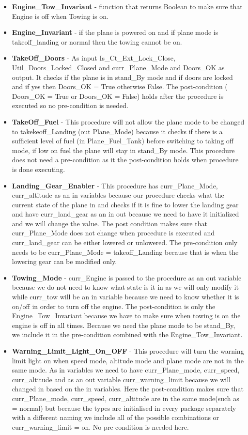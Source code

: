 \documentclass{llncs}
\begin{document}
\begin{itemize}
\item \textbf{Engine\_Tow\_Invariant} - function that returns Boolean to make sure that Engine is off when Towing is on.
\item \textbf{Engine\_Invariant} - if the plane is powered on and if plane mode is takeoff\_landing or normal then the towing cannot be on. 
\item \textbf{TakeOff\_Doors} - As input Is\_Ct\_Ext\_Lock\_Close, Util\_Doors\_Locked\_Closed  and curr\_Plane\_Mode and Doors\_OK as output. It checks if the plane is in stand\_By mode and if doors are locked and if yes then Doors\_OK = True otherwise False. The post-condition ( Doors\_OK = True or Doors\_OK = False) holds after the procedure is executed so no pre-condition is needed.
\item \textbf{TakeOff\_Fuel} - This procedure will not allow the plane mode to be changed to takekeoff\_Landing (out Plane\_Mode) because  it checks if there is a sufficient level of fuel (in Plane\_Fuel\_Tank) before switching to taking off mode, if low on fuel the plane will stay in stand\_By mode. This procedure does not need a pre-condition as it the post-condition holds when procedure is done executing.
\item \textbf{Landing\_Gear\_Enabler} - This procedure has curr\_Plane\_Mode, curr\_altitude as an in variables because our procedure checks what the current state of the plane in and checks if it is fine to lower the landing gear and have curr\_land\_gear as an in out because we need to have it initialized and we will change the value. The post condition makes sure that curr\_Plane\_Mode does not change when procedure is executed and curr\_land\_gear can be either lowered or unlowered. The pre-condition only needs to be curr\_Plane\_Mode = takeoff\_Landing because that is when the lowering gear can be modified only.  
\item \textbf{Towing\_Mode} -  curr\_Engine is passed to the procedure as an out variable because we do not need to know what state is it in as we will only modify it while curr\_tow will be an in variable because we need to know whether it is on/off in order to turn off the engine. The post-condition is only the Engine\_Tow\_Invariant because we have to make sure when towing is on the engine is off in all times. Because we need the plane mode to be stand\_By, we include it in the pre-condition combined with the Engine\_Tow\_Invariant.
\item \textbf{Warning\_Limit\_Light\_On\_OFF} - This procedure will turn the warning limit light on when speed mode, altitude mode and plane mode are not in the same mode. As in variables we need to have curr\_Plane\_mode,  curr\_speed, curr\_altitude and as an out variable curr\_warning\_limit because we will changed in based on the in variables. Here the post-condition makes sure that curr\_Plane\_mode,  curr\_speed, curr\_altitude are in the same mode(such as = normal) but because the types are initialised in every package separately with a different naming we include all of the possible combinations or curr\_warning\_limit = on. No pre-condition is needed here.

\end{itemize}
\end{document}
